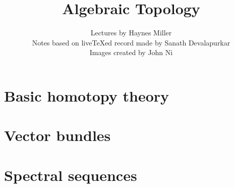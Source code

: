 \documentclass[11pt]{memoir}
\begin{document}
\title{Algebraic Topology}
\author{Lectures by Haynes Miller\\
Notes based on live{\TeX}ed record made by Sanath Devalapurkar\\
Images created by John Ni
}

\frontmatter

\maketitle

\newpage
\tableofcontents
\newpage

\mainmatter


\chapter{Basic homotopy theory}














\chapter{Vector bundles}









\chapter{Spectral sequences}










\end{document}
